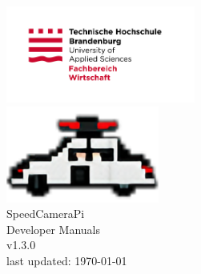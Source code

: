 \begin{titlepage}
    \begin{center}

        \vspace*{20mm}
        \includegraphics[height=120px]{texs/pre/image/2015_10_05_THB_FB-W_Logo_RGB.jpg}\\
        \includegraphics[height=120px]{texs/pre/image/speed_512_flat.png}\\
        {\normalsize SpeedCameraPi}\\[2mm]
        {\large \normalfont Developer Manuals\\[2mm]\small \normalfont v1.3.0}
        \\[5mm]

        {\small \normalfont last updated: \today}
        \vspace*{12mm}
        \small

    \end{center}
\end{titlepage}